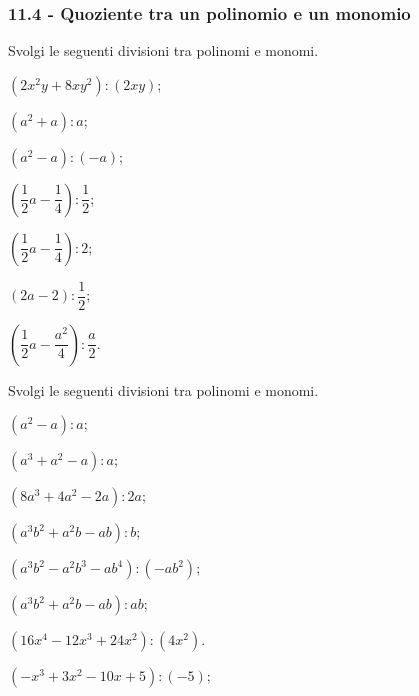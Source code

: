\subsubsection*{11.4 - Quoziente tra un polinomio e un monomio}
\begin{esercizio}
\label{ese:11.20} %
 Svolgi le seguenti divisioni tra polinomi e monomi.
 \begin{multicols}{2}
\begin{enumeratea}
 \item $\left(2x^{2}y+8{xy}^{2}\right):\left(2{xy}\right)$;
 \item $\left(a^{2}+a\right):a$;
 \item $\left(a^{2}-a\right):(-a)$;
 \item $\left(\dfrac{1}{2}a-\dfrac{1}{4}\right):\dfrac{1}{2}$;
 \item $\left(\dfrac{1}{2}a-\dfrac{1}{4}\right):2$;
 \item $(2a-2):\dfrac{1}{2}$;
 \item $\left(\dfrac{1}{2}a-\dfrac{a^{2}}{4}\right):\dfrac{a}{2}$.
\end{enumeratea}
\end{multicols}
\end{esercizio}

\begin{esercizio}
\label{ese:11.21} %
 Svolgi le seguenti divisioni tra polinomi e monomi.
 \begin{multicols}{2}
\begin{enumeratea}
 \item $\left(a^{2}-a\right):a$;
 \item $\left(a^{3}+a^{2}-a\right):a$;
 \item $\left(8a^{3}+4a^{2}-2a\right):2a$;
 \item $\left(a^{3}b^{2}+a^{2}b-ab\right):b$;
 \item $\left(a^{3}b^{2}-a^{2}b^{3}-ab^{4}\right):(-{ab}^{2})$;
 \item $\left(a^{3}b^{2}+a^{2}b-ab\right):ab$;
 \item $\left(16x^{4}-12x^{3}+24x^{2}\right):\left(4x^{2}\right)$.
 \item $\left(-x^{3}+3x^{2}-10x+5\right):(-5)$;
\end{enumeratea}
\end{multicols}
\end{esercizio}

